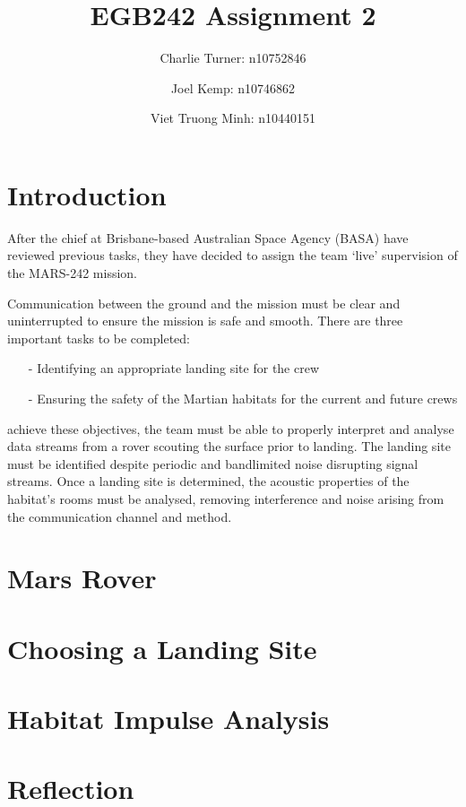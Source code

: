 \documentclass[a4paper]{article}
\author{
    Charlie Turner: n10752846
    \and
    Joel Kemp: n10746862
    \and
    Viet Truong Minh: n10440151
}
\title{EGB242 Assignment 2}
\begin{document}
\begin{titlepage}
    \maketitle
\end{titlepage}

\section{Introduction}

After the chief at Brisbane-based Australian Space Agency (BASA) have reviewed
previous tasks, they have decided to assign the team `live' supervision of the
MARS-242 mission.

Communication between the ground and the mission must be clear and
uninterrupted to ensure the mission is safe and smooth. There are three
important tasks to be completed:
\begin{itemize}
    \item[-] Identifying an appropriate landing site for the crew
    \item[-] Ensuring the safety of the Martian habitats for the current and future crews
\end{itemize}

\noindent achieve these objectives, the team must be able to properly interpret and
analyse data streams from a rover scouting the surface prior to landing.
The landing site must be identified despite periodic and bandlimited noise
disrupting signal streams. Once a landing site is determined, the acoustic
properties of the habitat's rooms must be analysed, removing interference and
noise arising from the communication channel and method.

\section{Mars Rover}
\section{Choosing a Landing Site}
\section{Habitat Impulse Analysis}
\section{Reflection}
\end{document}
